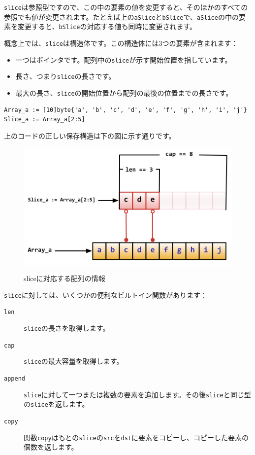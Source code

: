 \texttt{slice}は参照型ですので、この中の要素の値を変更すると、そのほかのすべての参照でも値が変更されます。たとえば上の\texttt{aSlice}と\texttt{bSlice}で、\texttt{aSlice}の中の要素を変更すると、\texttt{bSlice}の対応する値も同時に変更されます。

概念上では、\texttt{slice}は構造体です。この構造体には3つの要素が含まれます：　

\begin{itemize}
  \item 一つはポインタです。配列中の\texttt{slice}が示す開始位置を指しています。
  \item 長さ、つまり\texttt{slice}の長さです。
  \item 最大の長さ、\texttt{slice}の開始位置から配列の最後の位置までの長さです。
\end{itemize}


\begin{lstlisting}[numbers=none]
Array_a := [10]byte{'a', 'b', 'c', 'd', 'e', 'f', 'g', 'h', 'i', 'j'}
Slice_a := Array_a[2:5]
\end{lstlisting}

上のコードの正しい保存構造は下の図に示す通りです。

\begin{figure}[H]
  \includegraphics[width=14cm]{2.2.slice2.png}
   \label{図2.4}
   \caption{sliceに対応する配列の情報}
\end{figure}

\texttt{slice}に対しては、いくつかの便利なビルトイン関数があります：

\begin{description}
  \item[\texttt{len}] \texttt{slice}の長さを取得します。
  \item[\texttt{cap}] \texttt{slice}の最大容量を取得します。
  \item[\texttt{append}] \texttt{slice}に対して一つまたは複数の要素を追加します。その後\texttt{slice}と同じ型の\texttt{slice}を返します。
  \item[\texttt{copy}] 関数\texttt{copy}はもとの\texttt{slice}の\texttt{src}を\texttt{dst}に要素をコピーし、コピーした要素の個数を返します。
\end{description}

